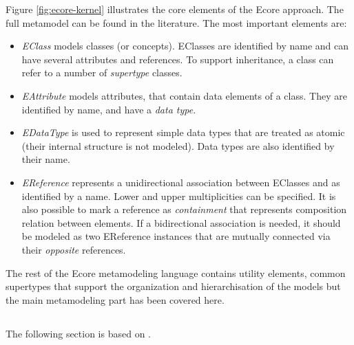  
 
Figure \ref{fig:ecore-kernel} illustrates the core elements of the Ecore approach. The full metamodel can be found in the literature. The most important elements are:

\begin{itemize}
  \item \emph{EClass} models classes (or concepts). EClasses are identified by
  name and can have several attributes and references. To support inheritance,
  a class can refer to a number of \emph{supertype} classes.
  \item \emph{EAttribute} models attributes, that contain data elements of a
  class. They are identified by name, and have a \emph{data type}.
  \item \emph{EDataType} is used to represent simple data types that are
  treated as atomic (their internal structure is not modeled). Data types are
  also identified by their name.
  \item \emph{EReference} represents a unidirectional association between
  EClasses and as identified by a name. Lower and upper multiplicities can be 
  specified. It is also possible to mark a reference as \emph{containment} that
  represents composition relation between elements. If a bidirectional
  association is needed, it should be modeled as two EReference instances
  that are mutually connected via their \emph{opposite} references.
\end{itemize}

The rest of the Ecore metamodeling language contains utility elements,
common supertypes that support the organization and hierarchisation of the
models but the main metamodeling part has been covered here.


\subsection{\eiq{}}
\label{subsec:eiq}

The following section is based on \cite{CsikosMasters}.



